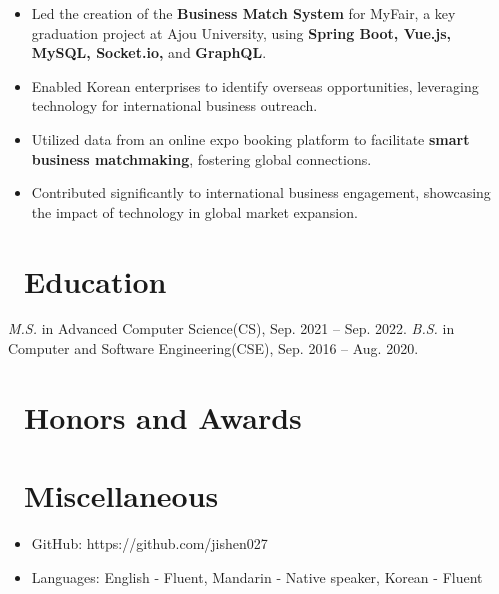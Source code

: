 \documentclass{resume}
\begin{document}
\begin{itemize}
  \item Led the creation of the \textbf{Business Match System} for MyFair, a key graduation project at Ajou University, using \textbf{Spring Boot, Vue.js, MySQL, Socket.io,} and \textbf{GraphQL}.
  \item Enabled Korean enterprises to identify overseas opportunities, leveraging technology for international business outreach.
  \item Utilized data from an online expo booking platform to facilitate \textbf{smart business matchmaking}, fostering global connections.
  \item Contributed significantly to international business engagement, showcasing the impact of technology in global market expansion.
\end{itemize}


\section{\faGraduationCap\ Education}
\textit{M.S.} in Advanced Computer Science(CS), Sep. 2021 -- Sep. 2022.
\textit{B.S.} in Computer and Software Engineering(CSE), Sep. 2016 -- Aug. 2020.

\section{\faHeartO\ Honors and Awards}

\section{\faInfo\ Miscellaneous}
\begin{itemize}[parsep=0.5ex]
  \item GitHub: https://github.com/jishen027
  \item Languages: English - Fluent, Mandarin - Native speaker, Korean - Fluent
\end{itemize}

%
%
\end{document}
